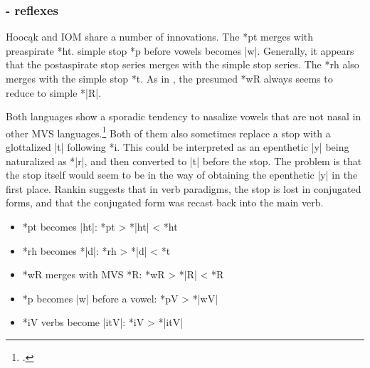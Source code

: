 \documentclass[output=paper]{LSP/langsci}
\begin{document}
\subsubsection{- reflexes}

Hooc\k{a}k and IOM share a number of innovations.  The  *pt merges with preaspirate *ht.   simple stop *p before vowels becomes |w|.  Generally, it appears that the postaspirate stop series merges with the simple stop series.  The *rh  also merges with the simple stop *t.  As in , the presumed  *wR always seems to reduce to simple *|R|.  

Both languages show a sporadic tendency to nasalize vowels that are not nasal in other MVS languages.\footnote{\citealt[50]{Rankinetal2006PDF}.} Both of them also sometimes replace a  stop with a glottalized |t\textsuperscript{}| following *i.  This could be interpreted as an epenthetic |y| being naturalized as *|r|, and then converted to |t| before the  stop.  The problem is that the  stop itself would seem to be in the way of obtaining the epenthetic |y| in the first place.  Rankin suggests that in verb paradigms, the  stop is lost in conjugated forms, and that the conjugated form was recast back into the main verb.

\begin{itemize}
\item *pt becomes |ht|: \hspace{7em} *pt	>	*|ht|	<	*ht
\item *rh becomes *|d|: \hspace{7em} *rh	>	*|d|	<	*t
\item *wR merges with MVS *R: \hspace{3em} *wR	>	*|R|	<	*R
\item *p becomes |w| before a vowel: \hspace{1em} *pV	>	*|wV|
\item *i\textsuperscript{}V verbs become |it\textsuperscript{}V|:	\hspace{4em} *i\textsuperscript{}V	>	*|it\textsuperscript{}V|
\end{itemize}
 
\end{document}
